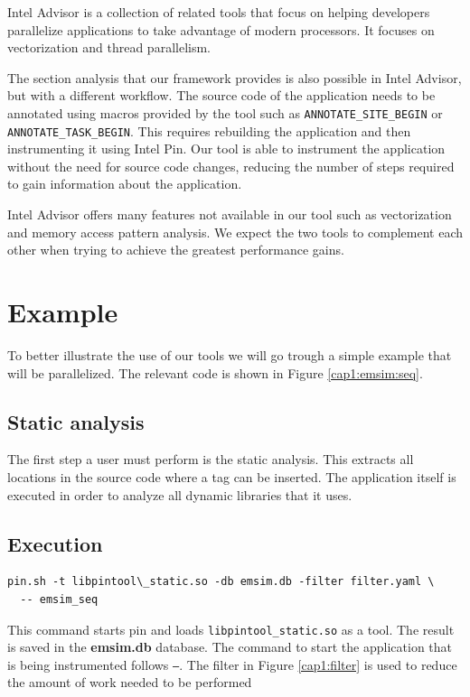 Intel Advisor \cite{inteladvisor} is a collection of related tools that focus on helping developers parallelize applications to take advantage of modern processors. It focuses on vectorization and thread parallelism.

The section analysis that our framework provides is also possible in Intel Advisor, but with a different workflow. The source code of the application needs to be annotated using macros provided by the tool such as \texttt{ANNOTATE\_SITE\_BEGIN} or \texttt{ANNOTATE\_TASK\_BEGIN}. This requires rebuilding the application and then instrumenting it using Intel Pin. Our tool is able to instrument the application without the need for source code changes, reducing the number of steps required to gain information about the application.

Intel Advisor offers many features not available in our tool such as vectorization and memory access pattern analysis. We expect the two tools to complement each other when trying to achieve the greatest performance gains.

\section {Example}

To better illustrate the use of our tools we will go trough a simple example that will be parallelized. The relevant code is shown in Figure \ref{cap1:emsim:seq}.

\subsection {Static analysis}

The first step a user must perform is the static analysis. This extracts all locations in the source code where a tag can be inserted. The application itself is executed in order to analyze all dynamic libraries that it uses.

\subsection{Execution}

\begin{lstlisting}[style=BashInputStyle]
pin.sh -t libpintool\_static.so -db emsim.db -filter filter.yaml \
  -- emsim_seq
\end{lstlisting}

This command starts pin and loads \texttt{libpintool\_static.so} as a tool. The result is saved in the \textbf{emsim.db} database. The command to start the application that is being instrumented follows \texttt{--}. The filter in Figure \ref{cap1:filter} is used to reduce the amount of work needed to be performed

